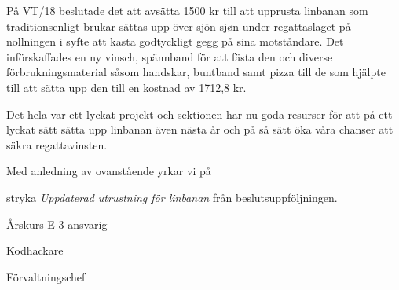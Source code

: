 \documentclass[../_main/handlingar.tex]{subfiles}
\begin{document}
På VT/18 beslutade det att avsätta 1500 kr till att upprusta linbanan som traditionsenligt brukar sättas upp över sjön sjøn under regattaslaget på nollningen i syfte att kasta godtyckligt gegg på sina motståndare. Det införskaffades en ny vinsch, spännband för att fästa den och diverse förbrukningsmaterial såsom handskar, buntband samt pizza till de som hjälpte till att sätta upp den till en kostnad av 1712,8 kr. 

Det hela var ett lyckat projekt och sektionen har nu goda resurser för att på ett lyckat sätt sätta upp linbanan även nästa år och på så sätt öka våra chanser att säkra regattavinsten. 

Med anledning av ovanstående yrkar vi på 


\begin{attsatser}
    \att stryka \emph{Uppdaterad utrustning för linbanan} från beslutsuppföljningen.
\end{attsatser}

\begin{signatures}{3}
    \mvh
	\signature{Jonatan Kronander}{Årskurs E-3 ansvarig}
	\signature{Filip Kronström}{Kodhackare}
	\signature{Magnus Lundh}{Förvaltningschef}
\end{signatures}
\end{document}
